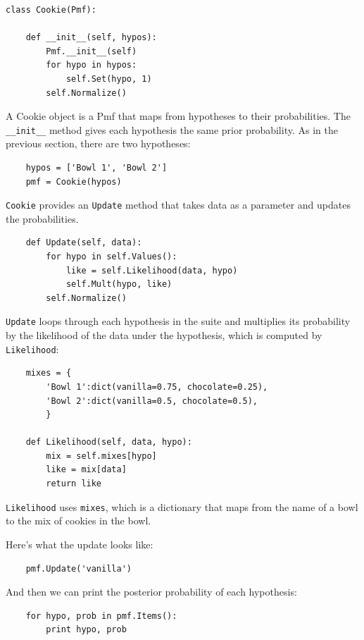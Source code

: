 \documentclass[12pt]{book}
\begin{document}
\begin{verbatim}
class Cookie(Pmf):

    def __init__(self, hypos):
        Pmf.__init__(self)
        for hypo in hypos:
            self.Set(hypo, 1)
        self.Normalize()
\end{verbatim}

A Cookie object is a Pmf that maps from hypotheses to their
probabilities.  The \verb"__init__" method gives each hypothesis
the same prior probability.  As in the previous section, there are
two hypotheses:

\begin{verbatim}
    hypos = ['Bowl 1', 'Bowl 2']
    pmf = Cookie(hypos)
\end{verbatim}

\verb"Cookie" provides an \verb"Update" method that takes
data as a parameter and updates the probabilities.

\begin{verbatim}
    def Update(self, data):
        for hypo in self.Values():
            like = self.Likelihood(data, hypo)
            self.Mult(hypo, like)
        self.Normalize()
\end{verbatim}

\verb"Update" loops through each hypothesis in the suite
and multiplies its probability by the likelihood of the
data under the hypothesis, which is computed by \verb"Likelihood":

\begin{verbatim}
    mixes = {
        'Bowl 1':dict(vanilla=0.75, chocolate=0.25),
        'Bowl 2':dict(vanilla=0.5, chocolate=0.5),
        }

    def Likelihood(self, data, hypo):
        mix = self.mixes[hypo]
        like = mix[data]
        return like
\end{verbatim}

\verb"Likelihood" uses \verb"mixes", which is a dictionary
that maps from the name of a bowl to the mix of cookies in
the bowl.

Here's what the update looks like:

\begin{verbatim}
    pmf.Update('vanilla')
\end{verbatim}

And then we can print the posterior probability of each hypothesis:

\begin{verbatim}
    for hypo, prob in pmf.Items():
        print hypo, prob
\end{verbatim}
\end{document}
